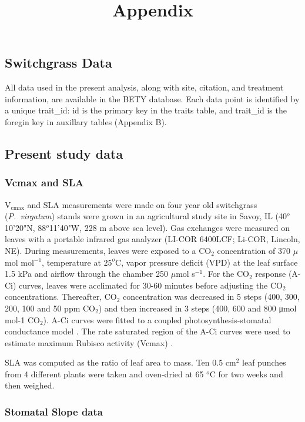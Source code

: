 \documentclass[12pt]{article}
\title{Appendix}
\date{} %
\begin{document}
\begin{flushleft}
\begin{spacing}{1.9}


\section{Switchgrass Data}
\end{spacing}
\begin{spacing}{1}
\label{app:data}
All data used in the present analysis, along with site, citation, and treatment information, are available in the BETY database. Each data point is identified by a unique trait\_id: id is the primary key in the traits table, and trait\_id is the foregin key in auxillary tables (Appendix B).

\subsection*{Present study data}
 
\subsubsection*{Vcmax and SLA}
V$_{\text{cmax}}$ and SLA measurements were made on four year old switchgrass (\emph{P.~virgatum}) stands were grown in an agricultural study site in Savoy, IL (40$^o$10'20"N, 88$^o$11'40"W, 228 m above sea level).
Gas exchanges were measured on leaves with a portable infrared gas analyzer (LI-COR 6400LCF; Li-COR, Lincoln, NE). 
During measurements, leaves were exposed to a CO$_2$ concentration of 370 $\mu$mol mol$^{-1}$, temperature at $25^o$C, vapor pressure deficit (VPD) at the leaf surface 1.5 kPa and airflow through the chamber 250 $\mu$mol s$^{-1}$. For the CO$_2$ response (A-Ci) curves, leaves were acclimated for 30-60 minutes before adjusting the CO$_2$ concentrations. 
Thereafter, CO$_2$ concentration was decreased in 5 steps (400, 300, 200, 100 and 50 ppm CO$_2$) and then increased in 3 steps (400, 600 and 800 μmol mol-1 CO$_2$). A-Ci curves were fitted to a coupled photosynthesis-stomatal conductance model \citep{collatz1992cps}. 
The rate saturated region of the A-Ci curves were used to estimate maximum Rubisco activity (Vcmax) \citep{miguez2009smp}. 

SLA was computed as the ratio of leaf area to mass. Ten 0.5 cm$^2$ leaf punches from 4 different plants were taken and oven-dried at 65 $^o$C for two weeks and then weighed.

\subsubsection*{Stomatal Slope data}


\end{spacing}
\end{flushleft}
\end{document}

